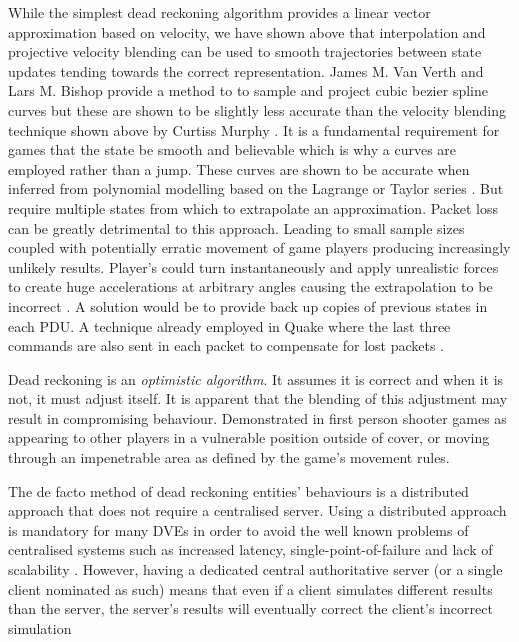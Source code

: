 \documentclass[journal]{IEEEtran}
\begin{document}
While the simplest dead reckoning algorithm provides a linear vector approximation based on velocity, we have shown above that interpolation and projective velocity blending can be used to smooth trajectories between state updates tending towards the correct representation. James M. Van Verth and Lars M. Bishop provide a method to to sample and project cubic bezier spline curves \cite{van2008essential} but these are shown to be slightly less accurate than the velocity blending technique shown above by Curtiss Murphy \cite{murphy2011believable}. It is a fundamental requirement for games that the state be smooth and believable which is why a curves are employed rather than a jump. These curves are shown to be accurate when inferred from polynomial modelling based on the Lagrange or Taylor series \cite{hanawa2006proposal}. But require multiple states from which to extrapolate an approximation. Packet loss can be greatly detrimental to this approach. Leading to small sample sizes coupled with potentially erratic movement of game players producing increasingly unlikely results. Player’s could turn instantaneously and apply unrealistic forces to create huge accelerations at arbitrary angles causing the extrapolation to be incorrect \cite{bernier2001latency}. A solution would be to provide back up copies of previous states in each PDU. A technique already employed in Quake where the last three commands are also sent in each packet to compensate for lost packets \cite{cronin2001distributed}.

Dead reckoning is an \textit{optimistic algorithm}. It assumes it is correct  and when it is not, it must adjust itself. It is apparent that the blending of this adjustment may result in compromising behaviour. Demonstrated in first person shooter games as appearing to other players in a vulnerable position outside of cover, or moving through an impenetrable area as defined by the game's movement rules.

The de facto method of dead reckoning entities' behaviours is a distributed approach that does not require a centralised server. Using a distributed approach is mandatory for many DVEs in order to avoid the well known problems of centralised systems such as increased latency, single-point-of-failure and lack of scalability \cite{mauve2000keep}. However, having a dedicated central authoritative server (or a single client nominated as such) means that even if a client simulates different results than the server, the server’s results will eventually correct the client’s incorrect simulation \cite{bernier2001latency}
\end{document}
